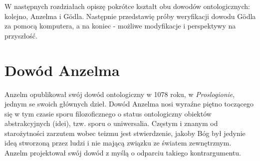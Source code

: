 \documentclass[
	runningheads
]{llncs}
\begin{document}
W następnych rozdziałach opiszę pokrótce kształt obu dowodów ontologicznych: kolejno, Anzelma i G\"odla. Następnie przedstawię próby weryfikacji dowodu G\"odla za pomocą komputera, a na koniec - możliwe modyfikacje i perspektywy na przyszłość. 

\section{Dowód Anzelma} \label{sec:dowod-anzelma}
Anzelm opublikował swój dowód ontologiczny w 1078 roku, w \textit{Proslogionie}, jednym se swoich głównych dzieł. Dowód Anzelma nosi wyraźne piętno toczącego się w tym czasie sporu filozoficznego o status ontologiczny obiektów abstrakcyjnych (idei), tzw. sporu o uniwersalia. Częstym i znanym od starożytności zarzutem wobec teizmu jest stwierdzenie, jakoby Bóg był jedynie ideą stworzoną przez ludzi i nie mającą związku ze światem zewnętrznym. Anzelm projektował swój dowód z myślą o odparciu takiego kontrargumentu. 
\end{document}
